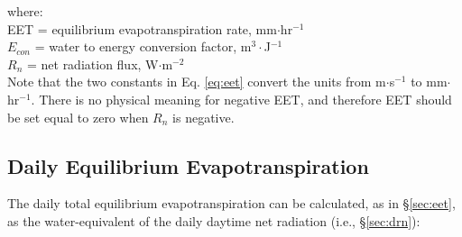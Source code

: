 \noindent where:\\
\indent EET = equilibrium evapotranspiration rate, mm$\cdot$hr$^{-1}$\\
\indent $E_{con}$ = water to energy conversion factor, m$^{3}\cdot$J$^{-1}$\\
\indent $R_n$ = net radiation flux, W$\cdot$m$^{-2}$ \\

\noindent Note that the two constants in Eq. \ref{eq:eet} convert the units from m$\cdot$s$^{-1}$ to mm$\cdot$hr$^{-1}$. 
There is no physical meaning for negative EET, and therefore EET should be set equal to zero when $R_n$ is negative. 

\subsection{Daily Equilibrium Evapotranspiration}
\label{sec:deet}
The daily total equilibrium evapotranspiration can be calculated, as in \S \ref{sec:eet}, as the water-equivalent of the daily daytime net radiation (i.e., \S \ref{sec:drn}):

